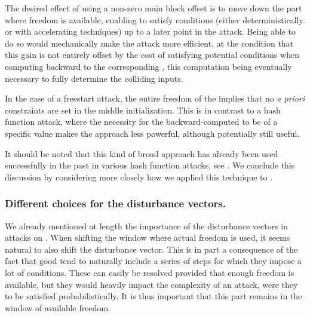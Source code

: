 The desired effect of using a non-zero main block offset is to move down the part where freedom is available, enabling to satisfy conditions (either deterministically or with accelerating techniques)
up to a later point in the attack. Being able to do so would mechanically make the attack more efficient, at the condition that this gain is not entirely offset by the cost
of satisfying potential conditions when computing backward to the corresponding \iv, this computation being eventually necessary to fully determine the colliding inputs.

In the case of a freestart attack, the entire freedom of the \iv implies that no \emph{a priori} constraints are set in the middle initialization. This is in contrast to a hash function attack, where
the necessity for the backward-computed \iv to be of a specific value makes the approach less powerful, although potentially still useful.


%
%
%
%

It should be noted that this kind of broad approach has already been used successfully in the past in various hash function attacks, see \eg \cite{DBLP:conf/fse/Dobbertin96,DBLP:conf/eurocrypt/LandelleP13,DBLP:conf/fse/MendelRS14}.
We conclude this discussion by considering more closely how we applied this technique to \shaone.

\subsubsection{Different choices for the disturbance vectors.}
We already mentioned at length the importance of the disturbance vectors in attacks on \shaone.
When shifting the window where actual freedom is used, it seems natural to also shift the disturbance vector.
This is in part a consequence of the fact that good \dvs tend to naturally include a series of steps for which they impose a lot of conditions. These can easily be resolved provided that
enough freedom is available, but they would heavily impact the complexity of an attack, were they to be satisfied probabilistically. It is thus important that this part remains
in the window of available freedom.

